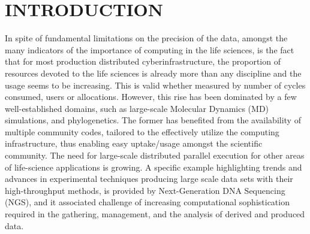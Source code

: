 \documentclass[]{svjour3}
\begin{document}


\section{INTRODUCTION}




In spite of fundamental limitations on the precision of the data,
amongst the many indicators of the importance of computing in the life
sciences, is the fact that for most production distributed
cyberinfrastructure, the proportion of resources devoted to the life
sciences is already more than any discipline and the usage seems to be
increasing. This is valid whether measured by number of cycles
consumed, users or allocations.  However, this rise has been dominated
by a few well-established domains,
such as large-scale Molecular Dynamics (MD) simulations, and
phylogenetics.  The former has benefited from the availability of
multiple community codes, tailored to the effectively utilize the
computing infrastructure, thus enabling easy uptake/usage amongst the
scientific community.  The need for large-scale distributed parallel
execution for other areas of life-science applications is growing.  A
specific example highlighting trends and advances in experimental
techniques producing large scale data sets with their high-throughput
methods, is provided by Next-Generation DNA Sequencing (NGS), and it
associated challenge of increasing computational sophistication
required in the gathering, management, and the analysis of derived and
produced data.
\end{document}
